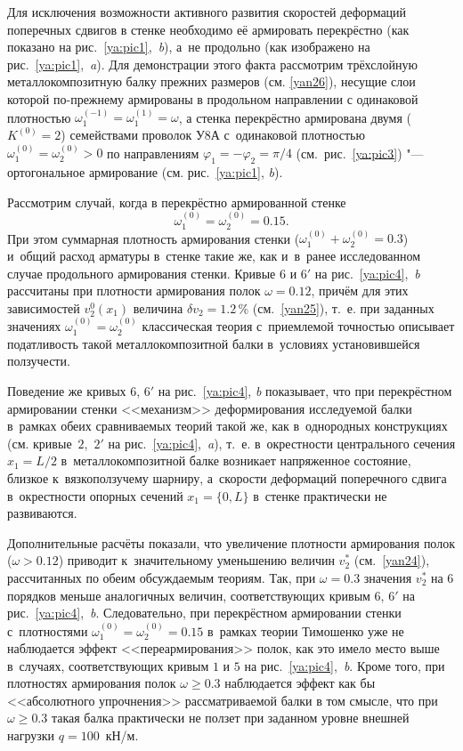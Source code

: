 Для исключения возможности активного развития скоростей деформаций поперечных сдвигов в стенке необходимо её армировать перекрёстно (как показано на рис.~\ref{ya:pic1},~{\sl b}), а~не продольно (как изображено на рис.~\ref{ya:pic1},~{\sl a}). 
Для демонстрации этого факта рассмотрим трёхслойную металлокомпозитную балку прежних размеров (см. \eqref{yan26}), несущие слои которой по-прежнему армированы в продольном направлении с одинаковой плотностью $\omega_1^{(-1)}=\omega_1^{(1)}=\omega$, а стенка перекрёстно армирована двумя ($K^{(0)}=2$) семействами проволок У8А с~одинаковой плотностью $\omega_1^{(0)}=\omega_2^{(0)}>0$ по направлениям $\varphi_1=-\varphi_2=\pi/4$ (см.~рис.~\ref{ya:pic3}) "--- ортогональное армирование (см. рис.~\ref{ya:pic1}, {\sl b}).

Рассмотрим случай, когда в перекрёстно армированной стенке 
$$\omega_1^{(0)}=\omega_2^{(0)}=0.15. $$
При этом суммарная плотность армирования стенки ($\omega_1^{(0)}+\omega_2^{(0)}=0.3$) 
и~общий расход арматуры в~стенке такие же, как и~в~ранее исследованном случае продольного армирования стенки. 
Кривые $6$ и $6'$ на рис.~\ref{ya:pic4},~{\sl b} рассчитаны при плотности армирования полок $\omega=0.12$, 
причём для этих зависимостей $v_2^0(x_1)$ величина $\delta v_2=1.2\,\%$ 
(см.~\eqref{yan25}), т.~е. при заданных значениях ${\omega_1^{(0)}=\omega_2^{(0)}}$ 
классическая теория с~приемлемой точностью описывает податливость такой металлокомпозитной балки в~условиях установившейся ползучести.

Поведение же кривых $6$, $6'$ на рис.~\ref{ya:pic4}, {\sl b} показывает, что при перекрёстном армировании стенки <<механизм>> деформирования исследуемой балки 
в~рамках обеих сравниваемых теорий такой же, как в~однородных конструкциях (см. кривые~$2$,~$2'$ 
на рис.~\ref{ya:pic4},~{\sl a}), т.~е. в~окрестности центрального сечения ${x_1=L/2}$ в~металлокомпозитной балке возникает напряженное состояние, близкое к~вязкоползучему шарниру, 
а~скорости деформаций поперечного сдвига в~окрестности опорных сечений $x_1=\{0, L\}$ 
в~стенке практически не развиваются.

Дополнительные расчёты показали, что увеличение плотности армирования полок ($\omega>0.12$) приводит 
к~значительному уменьшению величин $v_2^*$ (см.~\eqref{yan24}), рассчитанных по обеим обсуждаемым теориям. 
Так, при $\omega=0.3$ значения $v_2^*$ на 6 порядков меньше аналогичных величин, 
соответствующих кривым $6$, $6'$ на рис.~\ref{ya:pic4},~{\sl b}. 
Следовательно, при перекрёстном армировании стенки с~плотностями $\omega_1^{(0)}=\omega_2^{(0)}=0.15$ 
в~рамках теории Тимошенко уже не наблюдается эффект <<переармирования>> полок, 
как это имело место выше в~случаях, соответствующих кривым $1$ и $5$ на рис.~\ref{ya:pic4},~{\sl b}. 
Кроме того, при плотностях армирования полок $\omega\ge0.3$ наблюдается эффект как бы <<абсолютного упрочнения>> рассматриваемой балки в том смысле, 
что при $\omega\ge0.3$ такая балка практически не ползет при заданном уровне внешней нагрузки $q=100$~кН/м.

